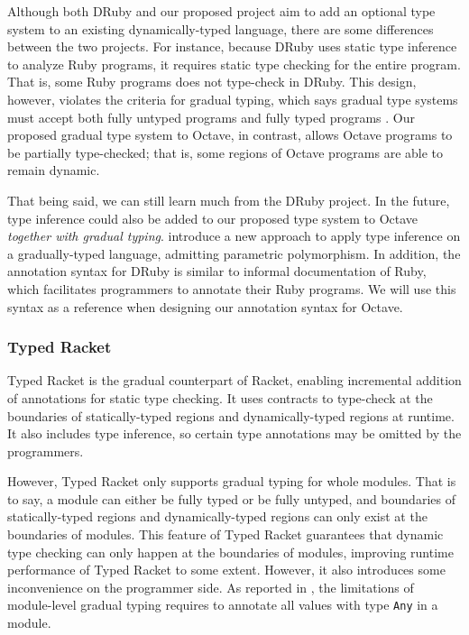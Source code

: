 Although both DRuby and our proposed project aim to add an optional type system to an existing dynamically-typed language, there are some differences between the two projects. For instance, because DRuby uses static type inference to analyze Ruby programs, it requires static type checking for the entire program. That is, some Ruby programs does not type-check in DRuby. This design, however, violates the criteria for gradual typing, which says gradual type systems must accept both fully untyped programs and fully typed programs \cite{siek2015refined}.  Our proposed gradual type system to Octave, in contrast, allows Octave programs to be partially type-checked; that is, some regions of Octave programs are able to remain dynamic.

That being said, we can still learn much from the DRuby project. In the future, type inference could also be added to our proposed type system to Octave \emph{together with gradual typing}. \citet{garcia2015principal} introduce a new approach to apply type inference on a gradually-typed language, admitting parametric polymorphism. In addition, the annotation syntax for DRuby is similar to informal documentation of Ruby, which facilitates programmers to annotate their Ruby programs. We will use this syntax as a reference when designing our annotation syntax for Octave.

\subsubsection{Typed Racket}
Typed Racket \cite{tobin2006interlanguage} is the gradual counterpart of Racket, enabling incremental addition of annotations for static type checking. It uses contracts to type-check at the boundaries of statically-typed regions and dynamically-typed regions at runtime. It also includes type inference, so certain type annotations may be omitted by the programmers.

However, Typed Racket only supports gradual typing for whole modules. That is to say, a module can either be fully typed or be fully untyped, and boundaries of statically-typed regions and dynamically-typed regions can only exist at the boundaries of modules. This feature of Typed Racket guarantees that dynamic type checking can only happen at the boundaries of modules, improving runtime performance of Typed Racket to some extent. However, it also introduces some inconvenience on the programmer side. As reported in \cite{figueroa2012practical}, the limitations of module-level gradual typing requires to annotate all values with type {\tt Any} in a module.

